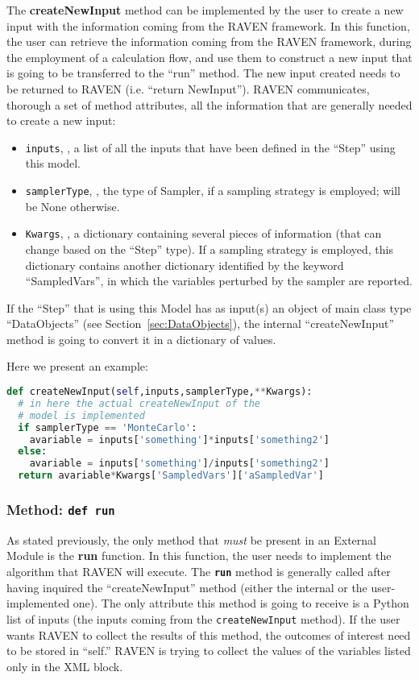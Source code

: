 The \textbf{createNewInput} method can be implemented by the user to create a
new input with the information coming from the RAVEN framework.
%
In this function, the user can retrieve the information coming from the RAVEN
framework, during the employment of a calculation flow, and use them to
construct a new input that is going to be transferred to the ``run'' method.
%
The new input created needs to be returned to RAVEN (i.e. ``return NewInput'').
%
RAVEN communicates, thorough a set of method attributes, all the information
that are generally needed to create a new input:
\begin{itemize}
  \item \texttt{inputs}, , a list of all the inputs that
  have been defined in the ``Step'' using this model.
  \item \texttt{samplerType}, , the type of Sampler, if a
  sampling strategy is employed; will be None otherwise.
  \item \texttt{Kwargs}, , a dictionary containing several
  pieces of information (that can change based on the ``Step'' type).
  If a sampling strategy is employed, this dictionary contains another
  dictionary identified by the keyword ``SampledVars'', in which the variables
  perturbed by the sampler are reported.
\end{itemize}
\nb If the ``Step'' that is using this Model has as input(s) an object of main
class type ``DataObjects'' (see Section~\ref{sec:DataObjects}), the internal ``createNewInput''
method is going to convert it in a dictionary of values.
%

Here we present an example:
\begin{lstlisting}[language=python]
def createNewInput(self,inputs,samplerType,**Kwargs):
  # in here the actual createNewInput of the
  # model is implemented
  if samplerType == 'MonteCarlo':
    avariable = inputs['something']*inputs['something2']
  else:
    avariable = inputs['something']/inputs['something2']
  return avariable*Kwargs['SampledVars']['aSampledVar']
\end{lstlisting}

\subsubsection{Method: \texttt{def run}}
\label{subsubsec:externalRun}
As stated previously, the only method that \emph{must} be present in an
External Module is the \textbf{run} function.
%
In this function, the user needs to implement the algorithm that RAVEN will
execute.
%
The \texttt{\textbf{run}} method is generally called after having inquired the
``createNewInput'' method (either the internal or the user-implemented one).
%
The only attribute this method is going to receive is a Python list of inputs
(the inputs coming from the \texttt{createNewInput} method).
%
If the user wants RAVEN to collect the results of this method, the outcomes of
interest need to be stored in ``self.''
%
\nb RAVEN is trying to collect the values of the variables listed only in the
 XML block.
%

